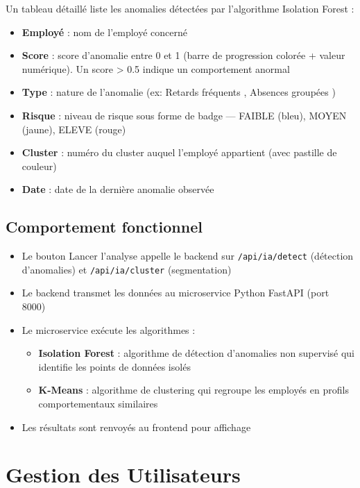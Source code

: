 \documentclass[12pt,a4paper]{report}
\begin{document}
Un tableau détaillé liste les anomalies détectées par l'algorithme Isolation Forest :
\begin{itemize}
    \item \textbf{Employé} : nom de l'employé concerné
    \item \textbf{Score} : score d'anomalie entre 0 et 1 (barre de progression colorée + valeur numérique). Un score > 0.5 indique un comportement anormal
    \item \textbf{Type} : nature de l'anomalie (ex: \og Retards fréquents \fg{}, \og Absences groupées \fg{})
    \item \textbf{Risque} : niveau de risque sous forme de badge — FAIBLE (bleu), MOYEN (jaune), ELEVE (rouge)
    \item \textbf{Cluster} : numéro du cluster auquel l'employé appartient (avec pastille de couleur)
    \item \textbf{Date} : date de la dernière anomalie observée
\end{itemize}

\section{Comportement fonctionnel}

\begin{itemize}
    \item Le bouton \og Lancer l'analyse \fg{} appelle le backend sur \texttt{/api/ia/detect} (détection d'anomalies) et \texttt{/api/ia/cluster} (segmentation)
    \item Le backend transmet les données au microservice Python FastAPI (port 8000)
    \item Le microservice exécute les algorithmes :
    \begin{itemize}
        \item \textbf{Isolation Forest} : algorithme de détection d'anomalies non supervisé qui identifie les points de données isolés
        \item \textbf{K-Means} : algorithme de clustering qui regroupe les employés en profils comportementaux similaires
    \end{itemize}
    \item Les résultats sont renvoyés au frontend pour affichage
\end{itemize}

\chapter{Gestion des Utilisateurs}
\end{document}
